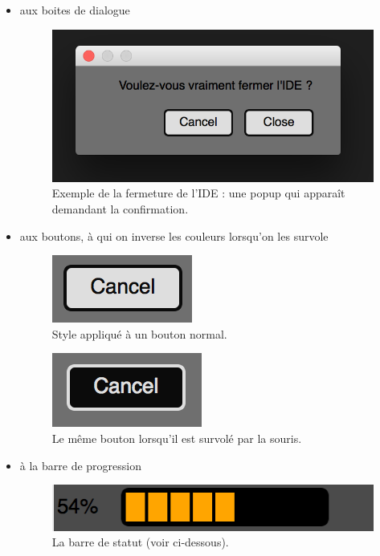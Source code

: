\documentclass[a4paper,12pt]{article}
\begin{document}
		\begin{itemize}
			\item aux boites de dialogue
				\begin{figure}[h!]
					\begin{center}
						\includegraphics[scale=0.4]{images/imgs_themes/quit}
						\caption{ Exemple de la fermeture de l'IDE : une popup qui apparaît demandant la confirmation.}
					\end{center}
				\end{figure}
				
			\item aux boutons, à qui on inverse les couleurs lorsqu'on les survole
				\begin{figure}[h!]
					\begin{center}
						\includegraphics[scale=1]{images/imgs_themes/bout1}
						\caption{Style appliqué à un bouton normal.}
					\end{center}
				\end{figure}
				\begin{figure}[h!]
					\begin{center}
						\includegraphics[scale=1]{images/imgs_themes/bout2}
						\caption{Le même bouton lorsqu'il est survolé par la souris.}
					\end{center}
				\end{figure}
				
			\item à la barre de progression
			\begin{figure}[h!]
					\begin{center}
						\includegraphics[scale=0.7]{images/imgs_themes/progress2}
						\caption{La barre de statut (voir ci-dessous).}
					\end{center}
				\end{figure}
		\end{itemize}
		
\end{document}
